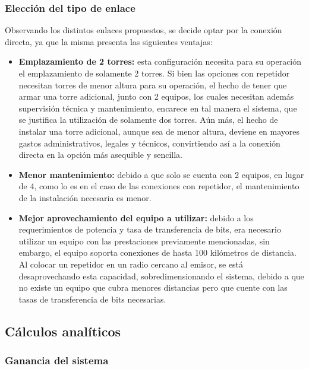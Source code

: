 \documentclass[11pt,a4paper]{article}
\begin{document}
\clearpage
\subsubsection{Elección del tipo de enlace}
Observando los distintos enlaces propuestos, se decide optar por la conexión directa, ya que la misma presenta las siguientes ventajas:

\begin{itemize}
  \item  \textbf{Emplazamiento de 2 torres:} esta configuración necesita para su operación el emplazamiento de solamente 2 torres. 
  Si bien las opciones con repetidor necesitan torres de menor altura para su operación, el hecho de tener que armar una torre adicional, junto con 2 equipos, los cuales necesitan además supervisión técnica y mantenimiento, encarece en tal manera el sistema, que se justifica la utilización de solamente dos torres. 
  Aún más, el hecho de instalar una torre adicional, aunque sea de menor altura, deviene en mayores gastos administrativos, legales y técnicos, convirtiendo así a la conexión directa en la opción más asequible y sencilla.

  \item \textbf{ Menor mantenimiento:} debido a que solo se cuenta con 2 equipos, en lugar de 4, como lo es en el caso de las conexiones con repetidor, el mantenimiento de la instalación necesaria es menor.

  \item \textbf{ Mejor aprovechamiento del equipo a utilizar:} debido a los requerimientos de potencia y tasa de transferencia de bits, era necesario utilizar un equipo con las prestaciones previamente mencionadas, sin embargo, el equipo soporta conexiones de hasta 100 kilómetros de distancia. 
  Al colocar un repetidor en un radio cercano al emisor, se está desaprovechando esta capacidad, sobredimensionando el sistema, debido a que no existe un equipo que cubra menores distancias pero que cuente con las tasas de transferencia de bits necesarias.
\end{itemize}

\subsection{Cálculos analíticos}

\subsubsection{Ganancia del sistema}
\end{document}
